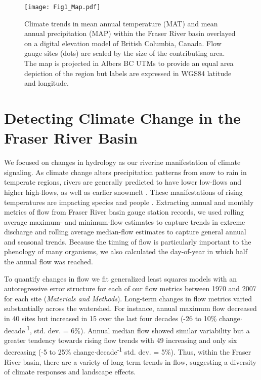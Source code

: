 \documentclass[9pt,twocolumn,twoside,lineno]{pnas-new}
\begin{document}
\begin{figure*}[h]
\centering
\texttt{[image: Fig1\_Map.pdf]}
	\caption{Climate trends in mean annual temperature (MAT) and mean annual precipitation (MAP) within the Fraser River basin overlayed on a digital elevation model of British Columbia, Canada. Flow gauge sites (dots) are scaled by the size of the contributing area. The map is projected in Albers BC UTMs to provide an equal area depiction of the region but labels are expressed in WGS84 latitude and longitude.}
\label{fig:1}
\end{figure*}

\section*{Detecting Climate Change in the Fraser River Basin}
We focused on changes in hydrology as our riverine manifestation of climate signaling. As climate change alters precipitation patterns from snow to rain in temperate regions, rivers are generally predicted to have lower low-flows and higher high-flows, as well as earlier snowmelt \cite{Nijssen:2001}. These manifestations of rising temperatures are impacting species \cite{Xenopoulos:2006} and people \cite{Hirabayashi:2013}. Extracting annual and monthly metrics of flow from Fraser River basin gauge station records, we used rolling average maximum- and minimum-flow estimates to capture trends in extreme discharge and rolling average median-flow estimates to capture general annual and seasonal trends. Because the timing of flow is particularly important to the phenology of many organisms, we also calculated the day-of-year in which half the annual flow was reached. 

To quantify changes in flow we fit generalized least squares models with an autoregressive error structure for each of our flow metrics between 1970 and 2007 for each site (\textit{Materials and Methods}). Long-term changes in flow metrics varied substantially across the watershed. For instance, annual maximum flow decreased in 40 sites but increased in 15 over the last four decades (-26 to 10\% change$\cdot$decade\textsuperscript{-1}, std. dev. = 6\%). Annual median flow showed similar variability but a greater tendency towards rising flow trends with 49 increasing and only six decreasing (-5 to 25\% change$\cdot$decade\textsuperscript{-1} std. dev. = 5\%). Thus, within the Fraser River basin, there are a variety of long-term trends in flow, suggesting a diversity of climate responses and landscape effects.
\end{document}
